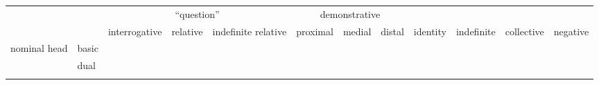 \begin{tabular}{l l l l l l l l l l l l}
    \toprule
                              &       & \multicolumn{3}{c}{``question''}                 & \multicolumn{3}{c}{demonstrative} &          &            &            &          \\ \cmidrule(lr){3-5} \cmidrule(lr){6-8}
                              &       & interrogative & relative & indefinite relative & proximal    & medial   & distal   & identity & indefinite & collective & negative \\ \midrule
\multirow{2}{*}{nominal head} & basic &               &          &                     &             &          &          &          &            &            &          \\
                              & dual  &               &          &                     &             &          &          &          &            &            &          \\
                              &       &               &          &                     &             &          &          &          &            &            &         \\
                              \bottomrule
\end{tabular}